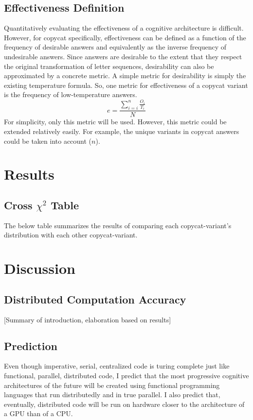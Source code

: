 \documentclass[a4paper]{article}
\begin{document}
    \subsection{Effectiveness Definition}

        Quantitatively evaluating the effectiveness of a cognitive architecture is difficult.
        However, for copycat specifically, effectiveness can be defined as a function of the frequency of desirable answers and equivalently as the inverse frequency of undesirable answers.
        Since answers are desirable to the extent that they respect the original transformation of letter sequences, desirability can also be approximated by a concrete metric.
        A simple metric for desirability is simply the existing temperature formula.
        So, one metric for effectiveness of a copycat variant is the frequency of low-temperature answers.
        $$e = \frac{\sum_{i=i}^{n} \frac{O_i}{T_i}}{N} $$
        For simplicity, only this metric will be used.
        However, this metric could be extended relatively easily.
        For example, the unique variants in copycat answers could be taken into account ($n$).
       
\section{Results}

    \subsection{Cross $\chi^2$ Table}

        The below table summarizes the results of comparing each copycat-variant's distribution with each other copycat-variant.
        

\section{Discussion}

    \subsection{Distributed Computation Accuracy}

        [Summary of introduction, elaboration based on results]

    \subsection{Prediction}

        Even though imperative, serial, centralized code is turing complete just like functional, parallel, distributed code, I predict that the most progressive cognitive architectures of the future will be created using functional programming languages that run distributedly and in true parallel. 
        I also predict that, eventually, distributed code will be run on hardware closer to the architecture of a GPU than of a CPU.



\end{document}
